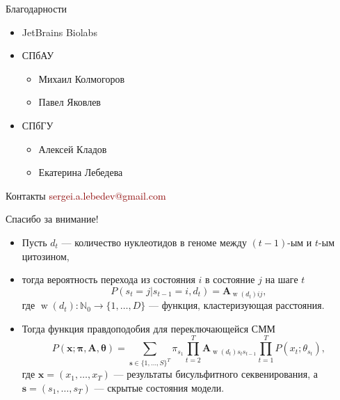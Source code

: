 \documentclass[unicode,mathserif]{beamer}
\newcommand{\hl}[1]{\textcolor{darkred}{#1}}
\begin{document}
\begin{frame}
  \begin{block}{Благодарности}
    \begin{itemize}
    \item JetBrains Biolabs
    \item СПбАУ
      \begin{itemize}
      \item Михаил Колмогоров
      \item Павел Яковлев
      \end{itemize}
    \item СПбГУ
      \begin{itemize}
      \item Алексей Кладов
      \item Екатерина Лебедева
      \end{itemize}
    \end{itemize}
  \end{block}

  \begin{block}{Контакты}
    \vspace{7pt}
    \hl{sergei.a.lebedev@gmail.com}
  \end{block}

  \vfill
  \centering
  \Large{Спасибо за внимание!}
\end{frame}


\begin{frame}
  \begin{itemize}
  \item Пусть $d_t$ --- количество нуклеотидов в геноме между $(t-1)$-ым и $t$-ым цитозином,
  \item тогда вероятность перехода из состояния $i$ в состояние $j$ на шаге $t$
    $$
    P(s_t = j|s_{t-1} = i, d_t) = \mathbf{A}_{\operatorname{w}(d_t)ij},
    $$
    где $\operatorname{w}(d_t) : \mathbb{N}_0 \to \{1, \ldots, D\}$ --- функция,
    кластеризующая расстояния.
  \item Тогда функция правдоподобия для переключающейся СММ
    $$
    P(\mathbf{x}; \mathbf{\pi}, \mathbf{A}, \mathbf{\theta})
    = \sum\limits_{\mathbf{s} \in \{1, \ldots, S\}^T}
    \pi_{s_1}
    \prod\limits_{t = 2}^T \mathbf{A}_{\operatorname{w}(d_t) s_t s_{t - 1}}
    \prod\limits_{t = 1}^T P(x_t; \theta_{s_t}),
    $$
    где $\mathbf{x} = (x_1, \ldots, x_T)$ --- результаты бисульфитного
    секвенирования, а $\mathbf{s} = (s_1, \ldots, s_T)$ --- скрытые состояния модели.
  \end{itemize}
\end{frame}
\end{document}
